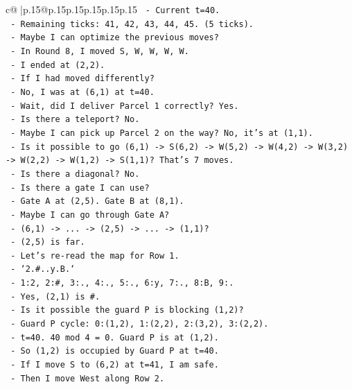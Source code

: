 \documentclass{article}
\begin{document}
{\begin{supertabular}{c@{$\;$}|p{.15\linewidth}@{}p{.15\linewidth}p{.15\linewidth}p{.15\linewidth}p{.15\linewidth}p{.15\linewidth}}
{{{\texttt{        {-} Current t=40.} \\
\texttt{        {-} Remaining ticks: 41, 42, 43, 44, 45. (5 ticks).} \\
\texttt{      {-} Maybe I can optimize the previous moves?} \\
\texttt{      {-} In Round 8, I moved S, W, W, W, W.} \\
\texttt{      {-} I ended at (2,2).} \\
\texttt{      {-} If I had moved differently?} \\
\texttt{      {-} No, I was at (6,1) at t=40.} \\
\texttt{      {-} Wait, did I deliver Parcel 1 correctly? Yes.} \\
\texttt{      {-} Is there a teleport? No.} \\
\texttt{      {-} Maybe I can pick up Parcel 2 on the way? No, it's at (1,1).} \\
\texttt{      {-} Is it possible to go (6,1) {-}> S(6,2) {-}> W(5,2) {-}> W(4,2) {-}> W(3,2) {-}> W(2,2) {-}> W(1,2) {-}> S(1,1)? That's 7 moves.} \\
\texttt{      {-} Is there a diagonal? No.} \\
\texttt{      {-} Is there a gate I can use?} \\
\texttt{      {-} Gate A at (2,5). Gate B at (8,1).} \\
\texttt{      {-} Maybe I can go through Gate A?} \\
\texttt{      {-} (6,1) {-}> ... {-}> (2,5) {-}> ... {-}> (1,1)?} \\
\texttt{      {-} (2,5) is far.} \\
\texttt{      {-} Let's re{-}read the map for Row 1.} \\
\texttt{      {-} `2.\#..y.B.`} \\
\texttt{      {-} 1:2, 2:\#, 3:., 4:., 5:., 6:y, 7:., 8:B, 9:.} \\
\texttt{      {-} Yes, (2,1) is \#.} \\
\texttt{      {-} Is it possible the guard P is blocking (1,2)?} \\
\texttt{      {-} Guard P cycle: 0:(1,2), 1:(2,2), 2:(3,2), 3:(2,2).} \\
\texttt{      {-} t=40. 40 mod 4 = 0. Guard P is at (1,2).} \\
\texttt{      {-} So (1,2) is occupied by Guard P at t=40.} \\
\texttt{      {-} If I move S to (6,2) at t=41, I am safe.} \\
\texttt{      {-} Then I move West along Row 2.} \\
}}}
\end{supertabular}}
\end{document}
